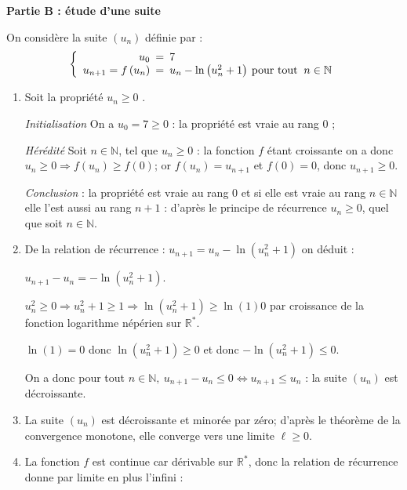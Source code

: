 \documentclass[10pt]{article}
\providecommand{\R}{\mathbb{R}}
\providecommand{\N}{\mathbb{N}}
\begin{document}
\begin{center}\textbf{Partie B : étude d'une suite}
\end{center}

On considère la suite $\left(u_n\right)$ définie par : 
\[\left\{\begin{array}{r !{=} l}
u_0& 7\\
u_{n+1} = f\left(u_n\right) &  u_n - \ln\left(u_n^2 + 1\right)\:\text{pour tout }\:n \in \N
\end{array}\right.\]

\begin{enumerate}
\item 
Soit la propriété \og $u_n\geqslant 0$ \fg{}.

\emph{Initialisation } On a $u_0 = 7 \geqslant 0$ : la propriété est vraie au rang 0 ;

\emph{Hérédité} Soit $n \in \N$, tel que $u_n \geqslant 0$ : la fonction $f$ étant croissante on a donc 
$u_n \geqslant 0 \Rightarrow f(u_n) \geqslant f(0)$; or  $f(u_n)=u_{n+1}$ et $f(0)=0$, donc $u_{n+1} \geqslant 0$.

\emph{Conclusion} : la propriété est vraie au rang 0 et si elle est vraie au rang $n \in \N$ elle l'est aussi au rang $n + 1$ : d'après le principe de récurrence $u_n \geqslant 0$, quel que soit $n \in \N$.

\item 
De la relation de récurrence : $u_{n+1}  = u_n - \ln\left(u_n^2 + 1\right)$ on déduit :

$u_{n+1} - u_n = - \ln  \left(u_n^2 + 1 \right)$.

$u_n^2 \geqslant 0 \Rightarrow u_n^2 +1  \geqslant 1 \Rightarrow \ln \left(u_n^2 + 1\right) \geqslant \ln (1)0$ par croissance de la fonction logarithme népérien sur $\R^*$.

$\ln(1)=0$ donc $\ln\left(u_n^2 + 1\right) \geqslant  0$ et donc $- \ln\left(u_n^2 + 1\right) \leqslant  0$.

On a donc pour tout $n \in \N,\: u_{n+1} - u_n \leqslant 0 \iff u_{n+1} \leqslant u_n$ : la suite $\left(u_n\right)$ est décroissante. 

\item 
La suite $\left(u_n\right)$ est décroissante et minorée par zéro; d'après le théorème de la convergence monotone, elle converge  vers une limite $\ell \geqslant 0$.

\item 
La fonction $f$ est continue car dérivable sur $\R^*$, donc la relation de récurrence donne par limite en plus l'infini :


\end{enumerate}
\end{document}
